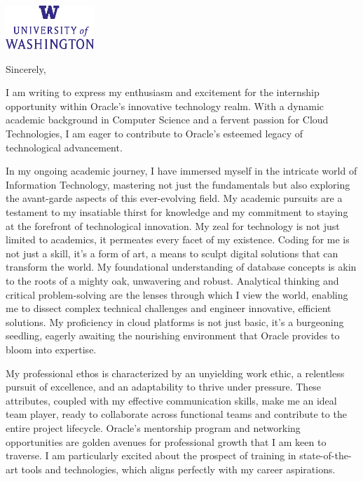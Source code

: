 \documentclass[11pt,letterpaper,roman]{moderncv}
\begin{document}
\begin{minipage}[t]{\textwidth}
\includegraphics[width=0.25\textwidth]{logo.eps}
\end{minipage}


\opening{\vspace*{-2em}}
\closing{Sincerely,}{\vspace*{-2em}}  
\makelettertitle
\justifying


I am writing to express my enthusiasm and excitement for the internship opportunity within Oracle’s innovative technology realm. With a dynamic academic background in Computer Science and a fervent passion for Cloud Technologies, I am eager to contribute to Oracle’s esteemed legacy of technological advancement.

In my ongoing academic journey, I have immersed myself in the intricate world of Information Technology, mastering not just the fundamentals but also exploring the avant-garde aspects of this ever-evolving field. My academic pursuits are a testament to my insatiable thirst for knowledge and my commitment to staying at the forefront of technological innovation. My zeal for technology is not just limited to academics, it permeates every facet of my existence. Coding for me is not just a skill, it's a form of art, a means to sculpt digital solutions that can transform the world. My foundational understanding of database concepts is akin to the roots of a mighty oak, unwavering and robust. Analytical thinking and critical problem-solving are the lenses through which I view the world, enabling me to dissect complex technical challenges and engineer innovative, efficient solutions. My proficiency in cloud platforms is not just basic, it's a burgeoning seedling, eagerly awaiting the nourishing environment that Oracle provides to bloom into expertise.

My professional ethos is characterized by an unyielding work ethic, a relentless pursuit of excellence, and an adaptability to thrive under pressure. These attributes, coupled with my effective communication skills, make me an ideal team player, ready to collaborate across functional teams and contribute to the entire project lifecycle. Oracle's mentorship program and networking opportunities are golden avenues for professional growth that I am keen to traverse. I am particularly excited about the prospect of training in state-of-the-art tools and technologies, which aligns perfectly with my career aspirations.
\end{document}
